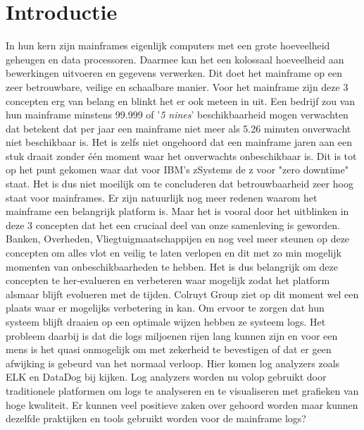 
\section{Introductie}%
\label{sec:introductie}

In hun kern zijn mainframes eigenlijk computers met een grote hoeveelheid geheugen en data processoren. Daarmee kan het een kolossaal hoeveelheid aan bewerkingen uitvoeren en gegevens verwerken. Dit doet het mainframe op een zeer betrouwbare, veilige en schaalbare manier. Voor het mainframe zijn deze 3 concepten erg van belang en blinkt het er ook meteen in uit. Een bedrijf zou van hun mainframe minstens 99.999 of '\textit{5 nines}' beschikbaarheid mogen verwachten dat betekent dat per jaar een mainframe niet meer als 5.26 minuten onverwacht niet beschikbaar is. Het is zelfs niet ongehoord dat een mainframe jaren aan een stuk draait zonder één moment waar het onverwachts onbeschikbaar is. Dit is tot op het punt gekomen waar dat voor IBM's zSystems de z voor "zero downtime" staat. Het is dus niet moeilijk om te concluderen dat betrouwbaarheid zeer hoog staat voor mainframes. Er zijn natuurlijk nog meer redenen waarom het mainframe een belangrijk platform is. Maar het is vooral door het uitblinken in deze 3 concepten dat het een cruciaal deel van onze samenleving is geworden. Banken, Overheden, Vliegtuigmaatschappijen en nog veel meer steunen op deze concepten om alles vlot en veilig te laten verlopen en dit met zo min mogelijk momenten van onbeschikbaarheden te hebben. Het is dus belangrijk om deze concepten te her-evalueren en verbeteren waar mogelijk zodat het platform alsmaar blijft evolueren met de tijden. Colruyt Group ziet op dit moment wel een plaats waar er mogelijks verbetering in kan. Om ervoor te zorgen dat hun systeem blijft draaien op een optimale wijzen hebben ze systeem logs. Het probleem daarbij is dat die logs miljoenen rijen lang kunnen zijn en voor een mens is het quasi onmogelijk om met zekerheid te bevestigen of dat er geen afwijking is gebeurd van het normaal verloop. Hier komen log analyzers zoals ELK en DataDog bij kijken. Log analyzers worden nu volop gebruikt door traditionele platformen om logs te analyseren en te visualiseren met grafieken van hoge kwaliteit. Er kunnen veel positieve zaken over gehoord worden maar kunnen dezelfde praktijken en tools gebruikt worden voor de mainframe logs?



